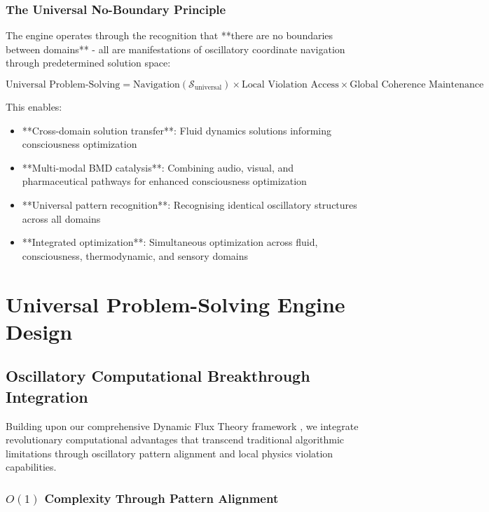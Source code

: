 \documentclass[11pt,a4paper]{article}
\theoremstyle{remark}
\begin{document}
\subsubsection{The Universal No-Boundary Principle}

The engine operates through the recognition that **there are no boundaries between domains** - all are manifestations of oscillatory coordinate navigation through predetermined solution space:

\begin{equation}
\text{Universal Problem-Solving} = \text{Navigation}(\mathcal{S}_{\text{universal}}) \times \text{Local Violation Access} \times \text{Global Coherence Maintenance}
\end{equation}

This enables:
\begin{itemize}
\item **Cross-domain solution transfer**: Fluid dynamics solutions informing consciousness optimization
\item **Multi-modal BMD catalysis**: Combining audio, visual, and pharmaceutical pathways for enhanced consciousness optimization
\item **Universal pattern recognition**: Recognising identical oscillatory structures across all domains
\item **Integrated optimization**: Simultaneous optimization across fluid, consciousness, thermodynamic, and sensory domains
\end{itemize}

\section{Universal Problem-Solving Engine Design}

\subsection{Oscillatory Computational Breakthrough Integration}

Building upon our comprehensive Dynamic Flux Theory framework \cite{sachikonye2024flux}, we integrate revolutionary computational advantages that transcend traditional algorithmic limitations through oscillatory pattern alignment and local physics violation capabilities.

\subsubsection{$O(1)$ Complexity Through Pattern Alignment}
\end{document}
